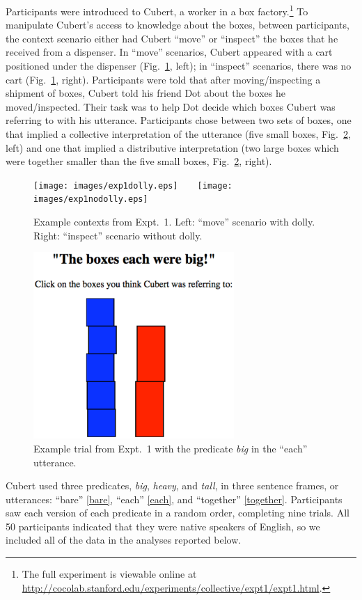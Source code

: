 \documentclass[preprint,12pt,authoryear,titlepage]{elsarticle}
\begin{document}
Participants were introduced to Cubert, a worker in a box factory.\footnote{The full experiment is viewable online at \url{http://cocolab.stanford.edu/experiments/collective/expt1/expt1.html}.} To manipulate Cubert's access to knowledge about the boxes, between participants, the context scenario either had Cubert ``move'' or ``inspect'' the boxes that he received from a dispenser. In ``move'' scenarios, Cubert appeared with a cart positioned under the dispenser (Fig.~\ref{expt1context}, left); in ``inspect'' scenarios, there was no cart (Fig.~\ref{expt1context}, right). Participants were told that after moving/inspecting a shipment of boxes, Cubert told his friend Dot about the boxes he moved/inspected. Their task was to help Dot decide which boxes Cubert was referring to with his utterance. Participants chose between two sets of boxes, one that implied a collective interpretation of the utterance (five small boxes, Fig.\ \ref{expt1trial}, left) and one that implied a distributive interpretation (two large boxes which were together smaller than the five small boxes, Fig.\ \ref{expt1trial}, right).

\begin{figure}[h]
	\centering
	\texttt{[image: images/exp1dolly.eps]}\ \ \ \ 
	\texttt{[image: images/exp1nodolly.eps]}
	\caption{Example contexts from Expt.~1. Left: ``move'' scenario with dolly. Right: ``inspect'' scenario without dolly.}\label{expt1context}
\end{figure}

\begin{figure}[h]
	\centering
	\includegraphics[width=3in]{images/trial2.eps}
	\caption{Example trial from Expt.~1 with the predicate \emph{big} in the ``each'' utterance.}\label{expt1trial}
\end{figure}

Cubert used three predicates, \emph{big}, \emph{heavy}, and \emph{tall}, in three sentence frames, or utterances: ``bare'' \ref{bare}, ``each'' \ref{each}, and ``together'' \ref{together}. Participants saw each version of each predicate in a random order, completing nine trials. All 50 participants indicated that they were native speakers of English, so we included all of the data in the analyses reported below.
\end{document}
